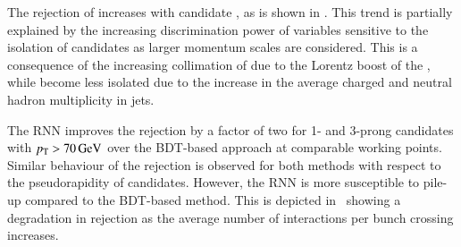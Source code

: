The \faketauhadvis rejection of \tauid increases with \tauhadvis
candidate \pT, as is shown in
. This trend is
partially explained by the increasing discrimination power of
variables sensitive to the isolation of \tauhadvis candidates as
larger momentum scales are considered. This is a consequence of the
increasing collimation of \truetauhadvis due to the Lorentz boost of
the \taulepton, while \faketauhadvis become less isolated due to the
increase in the average charged and neutral hadron multiplicity in
jets.


The RNN \tauid improves the \faketauhadvis rejection by a factor of
two for 1- and 3-prong \tauhadvis candidates with
$\pT > \SI{70}{\GeV}$ over the BDT-based approach at comparable
working points. Similar behaviour of the \faketauhadvis rejection is
observed for both methods with respect to the pseudorapidity of
\tauhadvis candidates. However, the RNN \tauid is more susceptible to
pile-up compared to the BDT-based method. This is depicted
in~ showing a
degradation in \faketauhadvis rejection as the average number of
interactions per bunch crossing increases.

